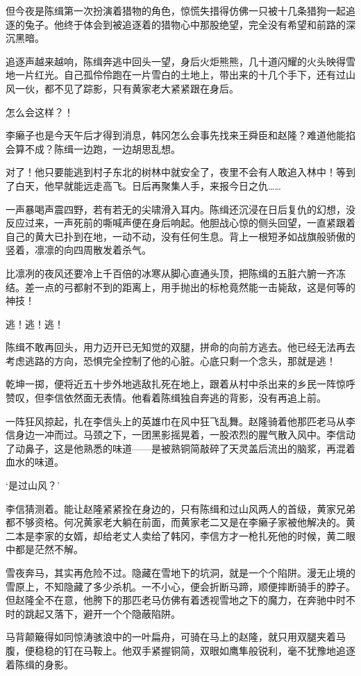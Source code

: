 但今夜是陈缉第一次扮演着猎物的角色，惊慌失措得仿佛一只被十几条猎狗一起追逐的兔子。他终于体会到被追逐着的猎物心中那股绝望，完全没有希望和前路的深沉黑暗。

追逐声越来越响，陈缉奔逃中回头一望，身后火炬熊熊，几十道闪耀的火头映得雪地一片红光。自己孤伶伶跑在一片雪白的土地上，带出来的十几个手下，还有过山风一伙，都不见了踪影，只有黄家老大紧紧跟在身后。

怎么会这样？！

李癞子也是今天午后才得到消息，韩冈怎么会事先找来王舜臣和赵隆？难道他能掐会算不成？陈缉一边跑，一边胡思乱想。

对了！他只要能逃到村子东北的树林中就安全了，夜里不会有人敢追入林中！等到了白天，他早就能远走高飞。日后再聚集人手，来报今日之仇……

一声暴喝声震四野，若有若无的尖啸滑入耳内。陈缉还沉浸在日后复仇的幻想，没反应过来，一声死前的嘶喊声便在身后响起。他胆战心惊的侧头回望，一直紧跟着自己的黄大已扑到在地，一动不动，没有任何生息。背上一根短矛如战旗般骄傲的竖着，凛凛的向四周散发着杀气。

比凛冽的夜风还要冷上千百倍的冰寒从脚心直通头顶，把陈缉的五脏六腑一齐冻结。差一点的弓都射不到的距离上，用手抛出的标枪竟然能一击毙敌，这是何等的神技！

逃！逃！逃！

陈缉不敢再回头，用力迈开已无知觉的双腿，拼命的向前方逃去。他已经无法再去考虑逃路的方向，恐惧完全控制了他的心脏。心底只剩一个念头，那就是逃！

乾坤一掷，便将近五十步外地逃敌扎死在地上，跟着从村中杀出来的乡民一阵惊呼赞叹，但李信依然面无表情。他看着陈缉独自奔逃的背影，没有再追上前。

一阵狂风掠起，扎在李信头上的英雄巾在风中狂飞乱舞。赵隆骑着他那匹老马从李信身边一冲而过。马颈之下，一团黑影摇晃着，一股浓烈的腥气散入风中。李信动了动鼻子，这是他熟悉的味道——是被熟铜简敲碎了天灵盖后流出的脑浆，再混着血水的味道。

‘是过山风？’

李信猜测着。能让赵隆紧紧拴在身边的，只有陈缉和过山风两人的首级，黄家兄弟都不够资格。何况黄家老大躺在前面，而黄家老二又是在李癞子家被他解决的。黄二本是李家的女婿，却给老丈人卖给了韩冈，李信方才一枪扎死他的时候，黄二眼中都是茫然不解。

雪夜奔马，其实再危险不过。隐藏在雪地下的坑洞，就是一个个陷阱。漫无止境的雪原上，不知隐藏了多少杀机。一不小心，便会折断马蹄，顺便摔断骑手的脖子。但赵隆全不在意，他胯下的那匹老马仿佛有着透视雪地之下的魔力，在奔驰中时不时的跳起又落下，避开一个个隐蔽陷阱。

马背颠簸得如同惊涛骇浪中的一叶扁舟，可骑在马上的赵隆，就只用双腿夹着马腹，便稳稳的钉在马鞍上。他双手紧握铜简，双眼如鹰隼般锐利，毫不犹豫地追逐着陈缉的身影。


